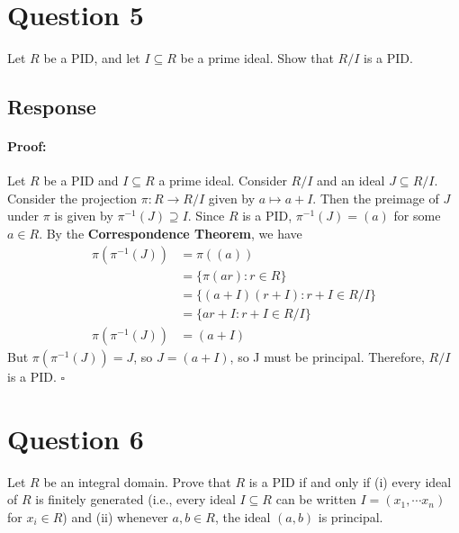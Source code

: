 \documentclass [12pt] {article}
\newenvironment{proof}{\paragraph{Proof:}}{\hfill$\square$}
\begin{document}


\newpage

\section*{Question 5}
Let $R$ be a PID, and let $I\subseteq R$ be a prime ideal. Show that $R/I$ is a PID.
\subsection*{Response}
\begin{proof}
    Let $R$ be a PID and $I \subseteq R$ a prime ideal. Consider $R/I$ and an ideal
    $J \subseteq R/I$. Consider the projection $\pi : R \to R/I$ given by $a \mapsto a + I$.
    Then the preimage of $J$ under $\pi$ is given by $\pi^{-1}(J) \supseteq I$. Since $R$ is a PID,
    $\pi^{-1}(J) = (a)$ for some $a \in R$. By the \textbf{Correspondence Theorem}, we have
    \begin{align*}
        \pi(\pi^{-1}(J)) &= \pi((a)) \\
                         &= \{ \pi(ar) : r \in R \} \\
                         &= \{ (a + I)(r + I) : r + I \in R/I \} \\
                         &= \{ ar + I : r + I \in R/I \} \\
        \pi(\pi^{-1}(J)) &= (a + I)
    \end{align*}
    But $\pi(\pi^{-1}(J)) = J$, so $J = (a + I)$, so J must be principal. Therefore, $R/I$ is a PID.
\end{proof}
\newpage

\section*{Question 6}
Let $R$ be an integral domain. Prove that $R$ is a PID if and only if (i) every ideal of $R$ is
finitely generated (i.e., every ideal $I\subseteq R$ can be written $I=(x_1,\cdots x_n)$ for
$x_i\in R$) and (ii) whenever $a, b\in R$, the ideal $(a,b)$ is principal.
\end{document}
